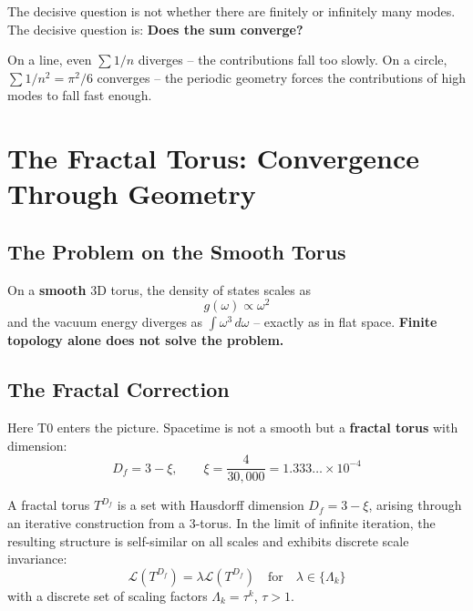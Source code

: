 	The decisive question is not whether there are finitely or infinitely many modes. The decisive question is: \textbf{Does the sum converge?}
	
	On a line, even $\sum 1/n$ diverges -- the contributions fall too slowly. On a circle, $\sum 1/n^2 = \pi^2/6$ converges -- the periodic geometry forces the contributions of high modes to fall fast enough.
	
	
	\section{The Fractal Torus: Convergence Through Geometry}
	
	\subsection{The Problem on the Smooth Torus}
	
	On a \textbf{smooth} 3D torus, the density of states scales as
	\begin{equation}
		g(\omega) \propto \omega^{2}
	\end{equation}
	and the vacuum energy diverges as $\int \omega^3 \, d\omega$ -- exactly as in flat space. \textbf{Finite topology alone does not solve the problem.}
	
	\subsection{The Fractal Correction}
	
	Here T0 enters the picture. Spacetime is not a smooth but a \textbf{fractal torus} with dimension:
	\begin{equation}
		D_f = 3 - \xi, \qquad \xi = \frac{4}{30{,}000} = 1.333\ldots \times 10^{-4}
	\end{equation}
	
	\begin{keypoint}
		A fractal torus $T^{D_f}$ is a set with Hausdorff dimension $D_f = 3 - \xi$, arising through an iterative construction from a 3-torus. In the limit of infinite iteration, the resulting structure is self-similar on all scales and exhibits discrete scale invariance:
		\begin{equation}
			\mathcal{L}(T^{D_f}) = \lambda \mathcal{L}(T^{D_f}) \quad \text{for} \quad \lambda \in \{\Lambda_k\}
		\end{equation}
		with a discrete set of scaling factors $\Lambda_k = \tau^k$, $\tau > 1$.
	\end{keypoint}
	
